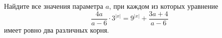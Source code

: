 \begin{ex}
	\begin{condition}
		Найдите все значения параметра \( a \), при каждом из которых уравнение
		\[ \dfrac{4a}{a-6}\cdot3^{|x|}=9^{|x|}+\dfrac{3a+4}{a-6} \]
		имеет ровно два различных корня.
	\end{condition}
\end{ex}